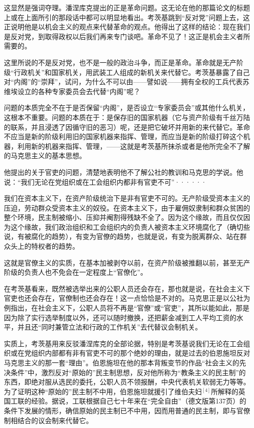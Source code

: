 \pskip 
\leftskip=0mm
\normalsize

这显然是强词夺理。潘涅库克提出的正是{\kaishu 革命}问题。这无论在他的那篇论文的标题上或在上面所引的那段话中都可以明显地看出。考茨基跳到“反对党”问题上去，这正说明他是以机会主义的观点来代替革命的观点。他得出了这样的结论：现在我们是反对党，到取得政权{\kaishu 以后}我们再来专门谈吧。{\kaishu 革命不见了}！这正是机会主义者所需要的。

这里所说的不是反对党，也不是一般的政治斗争，而正是{\kaishu 革命}。革命就是无产阶级“行政机关”和国家机关，用武装工人组成的新机关来代替它。考茨基暴露了自己对“内阁”的“崇拜”，试问，为什么不可以由——譬如说——拥有全权的工兵代表苏维埃设立的各种专家委员会去代替“内阁”呢？

问题的本质完全不在于是否保留“内阁”，是否设立“专家委员会”或其他什么机关，这根本不重要。问题的本质在于：是保存旧的国家机器（它与资产阶级有千丝万陆的联系，并且浸透了因循守旧的恶习）呢，还是把它{\kaishu 破坏}并用{\kaishu 新的}来代替它。革命不应当是新的阶级利用{\kaishu 旧的}国家机器来指挥、管理，而应当是新的阶级{\kaishu 打碎}这个机器，利用{\kaishu 新的}机器来指挥、管理，——这就是考茨基所抹杀或者是他所完全不了解的马克思主义的{\kaishu 基本}思想。

他提出的关于官吏的问题，清楚地表明他不了解公社的教训和马克思的学说。他说：“我们无论在党组织或在工会组织内都非有官吏不可”······

我们{\kaishu 在资本主义下，在资产阶级统治}下是非有官吏不可的。无产阶级受资本主义的压迫，劳动群众受资本主义的奴役。在资本主义下，由于雇佣奴隶制和群众贫困的整个环境，民主制被缩小、压抑并阉割得残缺不全了。因为这个缘故，而且仅仅因为这个缘故，我们政治组织和工会组织内的负责人被资本主义环境腐化了（确切些说，有被腐化的趋势），有变为官僚的趋势，也就是说，有变为脱离群众、站在群众{\kaishu 头上}的特权者的趋势。

这就是官僚主义的{\kaishu 实质}，在基本加被剥夺以前，在资产阶级被推翻以前，{\kaishu 甚至}无产阶级的负责人也不免会在一定程度上“官僚化”。

在考茨基看来，既然被选举出来的公职人员还会存在，那也就是说，在社会主义下官吏也还会存在，官僚制也还会存在！这一点恰恰是不对的。马克思正是以公社为例指出，在社会主义下，公职人员将不再是“官僚”或“官吏”，其所以能如此，那是{\kaishu 因为}除了实行选举制度以外，{\kaishu 还}可以随时撤换，{\kaishu 还}把薪金减到工人平均工资的水平，{\kaishu 并且还}“同时兼管立法和行政的工作机关”去代替议会制机关。

实质上，考茨基用来反驳潘涅库克的全部论据，特别是考茨基说我们无论在工会组织或在党组织内部都有非有官吏不可的那个绝妙的理由，就是过去的伯恩施坦反对马克思主义的那一套“理由”。伯恩施坦在他的那本背叛变节的作品“社会主义的先决条件”中，激烈反对“原始的”民主制思想，反对他所称为“教条主义的民主制”的东西，即绝对服从选民的委托，公职人员不领报酬，中央代表机关软弱无力等等。为了证明这种“原始的”民主制不中用，伯恩施坦就援引了维伯夫妇$^{[4]}$所解释的英国工联的经验。据说，工联根据自己七十年来在“完全自由”（德文版第137页）的条件下发展的情形，确信原始的民主制已不中用，因而用普通的民主制，即与官僚制相结合的议会制来代替它。


